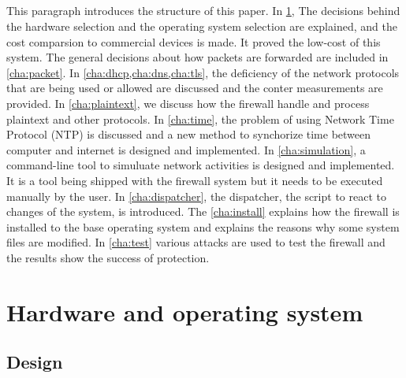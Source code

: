 \documentclass[mscthesis]{usiinfthesis}
\begin{document}
\paragraph{}
This paragraph introduces the structure of this paper. In \cref{cha:hard}, The decisions behind the hardware selection and the operating system selection are explained, and the cost comparsion to commercial devices is made. It proved the low-cost of this system. The general decisions about how packets are forwarded are included in \cref{cha:packet}. In \cref{cha:dhcp,cha:dns,cha:tls}, the deficiency of the network protocols that are being used or allowed are discussed and the conter measurements are provided. In \cref{cha:plaintext}, we discuss how the firewall handle and process plaintext and other protocols. In \cref{cha:time}, the problem of using Network Time Protocol (NTP) is discussed and a new method to synchorize time between computer and internet is designed and implemented. In \cref{cha:simulation}, a command-line tool to simuluate network activities is designed and implemented. It is a tool being shipped with the firewall system but it needs to be executed manually by the user. In \cref{cha:dispatcher}, the dispatcher, the script to react to changes of the system, is introduced. The \cref{cha:install} explains how the firewall is installed to the base operating system and explains the reasons why some system files are modified. In \cref{cha:test} various attacks are used to test the firewall and the results show the success of protection.

\chapter{Hardware and operating system}\label{cha:hard}
\section{Design}
\end{document}
